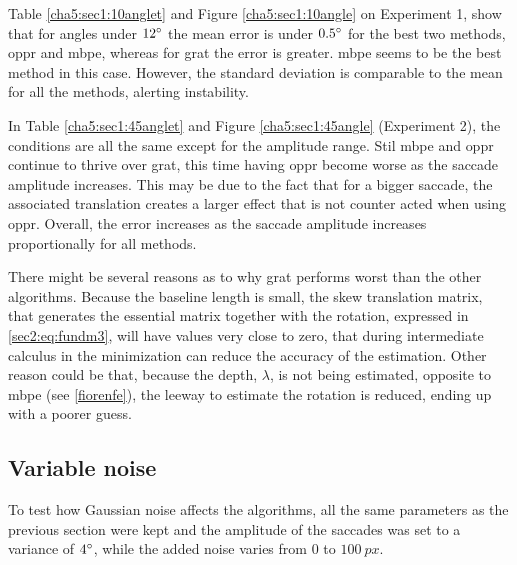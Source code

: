 Table \ref{cha5:sec1:10anglet} and Figure \ref{cha5:sec1:10angle} on Experiment 1, show that for angles under $ 12 \degree $ the mean error is under $0.5 \degree$ for the best two methods, \acrshort{oppr} and \acrshort{mbpe}, whereas for \acrshort{grat} the error is greater. \acrshort{mbpe} seems to be the best method in this case. However, the standard deviation is comparable to the mean for all the methods, alerting instability.

In Table \ref{cha5:sec1:45anglet} and Figure \ref{cha5:sec1:45angle} (Experiment 2), the conditions are all the same except for the amplitude range. Stil \acrshort{mbpe} and \acrshort{oppr} continue to thrive over \acrshort{grat}, this time having \acrshort{oppr} become worse as the saccade amplitude increases. This may be due to the fact that for a bigger saccade, the associated translation creates a larger effect that is not counter acted when using \acrshort{oppr}. Overall, the error increases as the saccade amplitude increases proportionally for all methods.

There might be several reasons as to why \acrshort{grat} performs worst than the other algorithms. Because the baseline length is small, the skew translation matrix, that generates the essential matrix together with the rotation, expressed in \ref{sec2:eq:fundm3}, will have values very close to zero, that during intermediate calculus in the minimization can reduce the accuracy of the estimation. Other reason could be that, because the depth, $\lambda$, is not being estimated, opposite to \acrshort{mbpe} (see \ref{fiorenfe}), the leeway to estimate the rotation is reduced, ending up with a poorer guess.
 

\subsection{Variable noise}
To test how Gaussian noise affects the algorithms, all the same parameters as the previous section were kept and the amplitude of the saccades was set to a variance of $4 \degree$, while the added noise varies from $0$ to $100 \ px$. 
